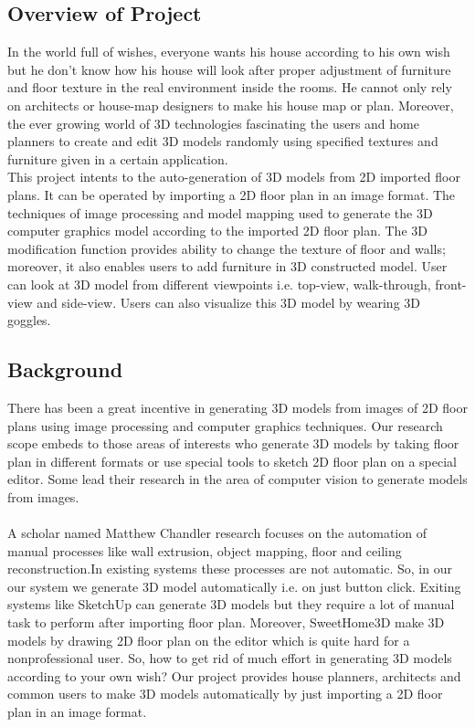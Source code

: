 \documentclass{article}
\begin{document}
\subsection{Overview of Project}
In the world full of wishes, everyone wants his house according to his own wish but he don't know how his house will look after proper adjustment of furniture and floor texture in the real environment inside the rooms. He cannot only rely on architects or house-map designers to make his house map or plan. Moreover, the ever growing world of 3D technologies fascinating the users and home planners to create and edit 3D models randomly using specified textures and furniture given in a certain application. 
\\
This project intents to the auto-generation of 3D models from 2D imported floor plans. It can be operated by importing a 2D floor plan in an image format. The techniques of image processing and model mapping used to generate the 3D computer graphics model according to the imported 2D floor plan. The 3D modification function provides ability to change the texture of floor and walls; moreover, it also enables users to add furniture in 3D constructed model. User can look at 3D model from different viewpoints i.e. top-view, walk-through, front-view and side-view. Users can also visualize this 3D model by wearing 3D goggles.
\subsection{Background}
There has been a great incentive in generating 3D models from images of 2D floor plans using image processing\cite{ImageP} and computer graphics techniques. Our research scope embeds to those areas of interests who generate 3D models by taking floor plan in different formats or use special tools  to sketch 2D floor plan on a special editor. Some lead their research in the area of computer vision to generate models from images.
\\
\\
A scholar named Matthew Chandler research focuses on the automation of manual processes like wall extrusion, object mapping, floor and ceiling reconstruction\cite{abc}.In existing systems these processes are not automatic. So, in our our system we generate 3D model automatically i.e. on just button click.
Exiting systems like SketchUp can generate 3D models but they require a lot of manual task to perform after importing floor plan. Moreover, SweetHome3D make 3D models by drawing 2D floor plan on the editor which is quite hard for a nonprofessional user. So, how to get rid of much effort in generating 3D models according to your own wish?
Our project provides house planners, architects and common users to make 3D models automatically by just importing a 2D floor plan in an image format.
\end{document}

